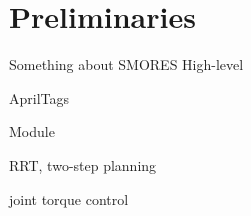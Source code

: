 \section{Preliminaries}\label{prelim}

Something about SMORES
High-level

AprilTags

Module

RRT, two-step planning

joint torque control